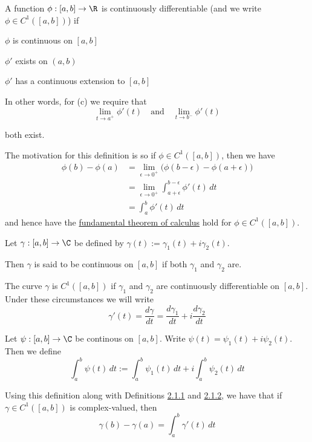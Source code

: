 \label{c1f6d35}

A function $\phi:[a,b]\to\R$ is continuously differentiable
(and we write $\phi\in C^1([a,b])$) if

\begin{enumerata}
	\item $\phi$ is continuous on $[a,b]$
	\item $\phi'$ exists on $(a,b)$
	\item $\phi'$ has a continuous extension to $[a,b]$
\end{enumerata}

In other words, for (c) we require that
$$
	\lim_{t\to a^+}\phi'(t)\quad\text{and}\quad\lim_{t\to b^-}\phi'(t)
$$

both exist.

The motivation for this definition is so if $\phi\in C^1([a,b])$, then
we have
\begin{align*}
	\phi(b)-\phi(a)
	 & =\lim_{\epsilon\to0^+}\big(\phi(b-\epsilon)-\phi(a+\epsilon)\big) \\
	 & =\lim_{\epsilon\to0^+}\int_{a+\epsilon}^{b-\epsilon}\phi'(t)\,dt  \\
	 & =\int_a^b\phi'(t)\,dt
\end{align*}
and hence have the \href{b869dc0}{fundamental theorem of calculus}
hold for $\phi\in C^1([a,b])$.

\label{e4132bc}

Let $\gamma:[a,b]\to\C$ be defined by $\gamma(t):=\gamma_1(t) +
	i\gamma_2(t)$.

Then $\gamma$ is said to be continuous on $[a,b]$ if both $\gamma_1$
and $\gamma_2$ are.

The curve $\gamma$ is $C^1([a,b])$ if $\gamma_1$ and $\gamma_2$ are
continuously differentiable on $[a,b]$. Under these circumstances we
will write
$$
	\gamma'(t)=\frac{d\gamma}{dt}=\frac{d\gamma_1}{dt}+i\frac{d\gamma_2}{dt}
$$

\label{c511702}

Let $\psi:[a,b]\to\C$ be continous on $[a,b]$. Write
$\psi(t)=\psi_1(t)+i\psi_2(t)$. Then we define
$$
	\int_a^b\psi(t)\,dt:=\int_a^b\psi_1(t)\,dt+i\int_a^b\psi_2(t)\,dt
$$

Using this definition along with Definitions \href{c1f6d35}{2.1.1}
and \href{e4132bc}{2.1.2}, we have that if $\gamma\in C^1([a,b])$
is complex-valued, then
$$
	\gamma(b)-\gamma(a)=\int_a^b\gamma'(t)\,dt
$$


